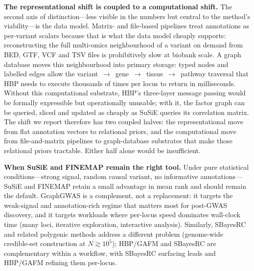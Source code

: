 \textbf{The representational shift is coupled to a computational
shift.} The second axis of distinction---less visible in the
numbers but central to the method's viability---is the data model.
Matrix- and file-based pipelines treat annotations as
per-variant scalars because that is what the data model cheaply
supports: reconstructing the full multi-omics neighbourhood of a
variant on demand from BED, GTF, VCF and TSV files is
prohibitively slow at biobank scale. A graph
database\cite{robinson2015graph} moves this neighbourhood into
primary storage: typed nodes and labelled edges allow the
variant~$\rightarrow$~gene~$\rightarrow$~tissue~$\rightarrow$~pathway traversal
that HBP needs to execute thousands of times per locus to return
in milliseconds. Without this computational substrate, HBP's
three-layer message passing would be formally expressible but
operationally unusable; with it, the factor graph can be queried,
sliced and updated as cheaply as SuSiE queries its correlation
matrix. The shift we report therefore has two coupled
halves: the representational move from flat annotation vectors to
relational priors, and the computational move from
file-and-matrix pipelines to graph-database substrates that make
those relational priors tractable. Either half alone would be
insufficient.

\textbf{When SuSiE and FINEMAP remain the right tool.} Under
pure statistical conditions---strong signal, random causal
variant, no informative annotations---SuSiE\cite{wang2020simple,zou2022fine}
and FINEMAP\cite{benner2016finemap} retain a small advantage in
mean rank\cite{hutchinson2020improving} and should remain the
default.
GraphGWAS is a complement, not a replacement: it targets the
weak-signal and annotation-rich regime that matters most for
post-GWAS discovery, and it targets workloads where per-locus
speed dominates wall-clock time (many loci, iterative
exploration, interactive analysis). Similarly, SBayesRC and
related polygenic methods address a different problem
(genome-wide credible-set construction at $N \gtrsim 10^5$);
HBP/GAFM and SBayesRC are complementary within a workflow, with
SBayesRC surfacing leads and HBP/GAFM refining them per-locus.

